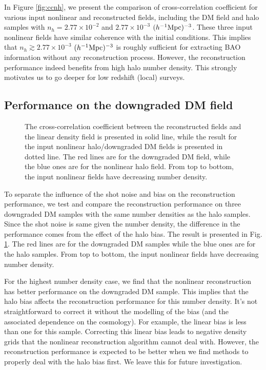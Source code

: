 \documentclass[iop]{emulateapj}
\newcommand{\mpch}{h^{-1} {\rm Mpc}}
\begin{document}
{In Figure \ref{fig:ccnh}, we present the comparison of cross-correlation coefficient for various input nonlinear and reconstructed fields, including the DM field and halo samples with $n_h=2.77\times 10^{-2}$ and $2.77\times 10^{-3}$ $(\mpch)^{-3}$.
These three input nonlinear fields have similar coherence with the initial conditions.
This implies that $n_h\gtrsim 2.77\times 10^{-3}$ $(\mpch)^{-3}$ is roughly sufficient for extracting BAO information without any reconstruction process.
However, the reconstruction performance indeed benefits from high halo number density.
This strongly motivates us to go deeper for low redshift (local) surveys.

\subsection{Performance on the downgraded DM field}
\label{sec:comparedm}

\begin{figure}
\epsfxsize=8.5cm
\caption{The cross-correlation coefficient between the reconstructed fields and the linear density field is presented in solid line, while the result for the input nonlinear halo/downgraded DM fields is presented in dotted line.
The red lines are for the downgraded DM field, while the blue ones are for the nonlinear halo field.
From top to bottom, the input nonlinear fields have decreasing number density.}
\label{fig:dptot}
\end{figure}

To separate the influence of the shot noise and bias on the reconstruction performance,
we test and compare the reconstruction performance on three downgraded DM samples with the same number densities as the halo samples.
Since the shot noise is same given the number density, the difference in the performance comes from the effect of the halo bias.
The result is presented in Fig. \ref{fig:dptot}.
The red lines are for the downgraded DM samples while the blue ones are for the halo samples.
From top to bottom, the input nonlinear fields have decreasing number density.

For the highest number density case, we find that the nonlinear reconstruction has better performance on the downgraded DM sample.
This implies that the halo bias affects the reconstruction performance for this number density.
It's not straightforward to correct it without the modelling of the bias (and the associated dependence on the cosmology).
For example, the linear bias is less than one for this sample.
Correcting this linear bias leads to negative density grids that the nonlinear reconstruction algorithm cannot deal with.
However, the reconstruction performance is expected to be better when we find methods to properly deal with the halo bias first.
We leave this for future investigation.

}
\end{document}
